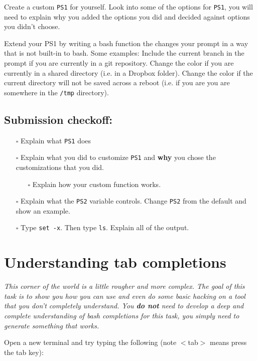 \documentclass{article}
\begin{document}
\medskip
\noindent
Create a custom \texttt{PS1} for yourself. Look into some of the options for
\texttt{PS1}, you will need to explain why you added the options you did and
decided against options you didn't choose.

\medskip
\noindent
Extend your PS1 by writing a bash function the changes your prompt in a way
that is not built-in to bash. Some examples: Include the current branch in the
prompt if you are currently in a git repository. Change the color if you are
currently in a shared directory (i.e. in a Dropbox folder). Change the color
if the current directory will not be saved across a reboot (i.e. if you are
you are somewhere in the \texttt{/tmp} directory).

\subsection*{Submission checkoff:}
\begin{itemize}
  \item[$\square$] Explain what \texttt{PS1} does
  \item[$\square$] Explain what you did to customize \texttt{PS1} and
    \textbf{why} you chose the customizations that you did.
    \begin{itemize}
      \item[$\square$] Explain how your custom function works.
    \end{itemize}
  \item[$\square$] Explain what the \texttt{PS2} variable controls. Change
    \texttt{PS2} from the default and show an example.
  \item[$\square$] Type \texttt{set -x}. Then type \texttt{ls}. Explain
    all of the output.
\end{itemize}


\section{Understanding tab completions}

\emph{This corner of the world is a little rougher and more complex. The goal
  of this task is to show you how you can use and even do some basic hacking
  on a tool that you don't completely understand. You \textbf{do not} need to
  develop a deep and complete understanding of bash completions for this task,
  you simply need to generate something that works.
}

\medskip
\noindent
Open a new terminal and try typing the following (note $<$tab$>$ means press
the tab key):
\end{document}
